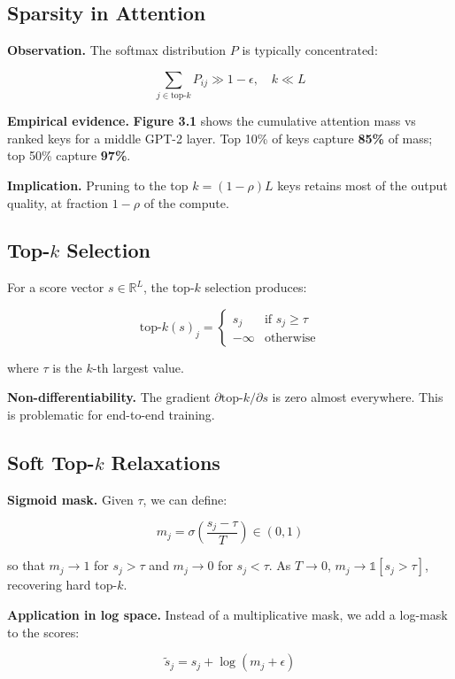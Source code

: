 \subsection{Sparsity in Attention}

\textbf{Observation.} The softmax distribution $P$ is typically concentrated:

\[
\sum_{j \in \text{top-}k} P_{ij} \gg 1 - \epsilon, \quad k \ll L
\]

\textbf{Empirical evidence.} \textbf{Figure 3.1} shows the cumulative attention mass 
vs ranked keys for a middle GPT-2 layer. Top 10\% of keys capture 
\textbf{85\%} of mass; top 50\% capture \textbf{97\%}.

\textbf{Implication.} Pruning to the top $k = (1 - \rho) L$ keys retains most 
of the output quality, at fraction $1 - \rho$ of the compute.

\subsection{Top-$k$ Selection}

For a score vector $s \in \mathbb{R}^L$, the top-$k$ selection produces:

\[
\text{top-}k(s)_j = \begin{cases} s_j & \text{if } s_j \geq \tau \\ -\infty & \text{otherwise} \end{cases}
\]

where $\tau$ is the $k$-th largest value.

\textbf{Non-differentiability.} The gradient $\partial \text{top-}k / \partial s$ 
is zero almost everywhere. This is problematic for end-to-end training.

\subsection{Soft Top-$k$ Relaxations}

\textbf{Sigmoid mask.} Given $\tau$, we can define:

\[
m_j = \sigma\!\left(\frac{s_j - \tau}{T}\right) \in (0, 1)
\]

so that $m_j \to 1$ for $s_j > \tau$ and $m_j \to 0$ for $s_j < \tau$. 
As $T \to 0$, $m_j \to \mathbb{1}[s_j > \tau]$, recovering hard top-$k$.

\textbf{Application in log space.} Instead of a multiplicative mask, we add a 
log-mask to the scores:

\[
\tilde{s}_j = s_j + \log(m_j + \epsilon)
\]

